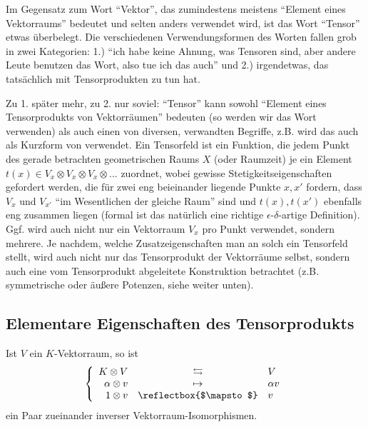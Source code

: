 \begin{remark}
Im Gegensatz zum Wort \enquote{Vektor}, das zumindestens meistens \enquote{Element eines Vektorraums} bedeutet und selten anders verwendet wird, ist das Wort \enquote{Tensor} etwas überbelegt. Die verschiedenen Verwendungsformen des Worten fallen grob in zwei Kategorien: 1.) \enquote{ich habe keine Ahnung, was Tensoren sind, aber andere Leute benutzen das Wort, also tue ich das auch} und 2.) irgendetwas, das tatsächlich mit Tensorprodukten zu tun hat.

\smallbreak
Zu 1. später mehr, zu 2. nur soviel: \enquote{Tensor} kann sowohl \enquote{Element eines Tensorprodukts von Vektorräumen} bedeuten (so werden wir das Wort verwenden) als auch einen von diversen, verwandten Begriffe, z.B. wird das auch als Kurzform von  verwendet. Ein Tensorfeld ist ein Funktion, die jedem Punkt des gerade betrachten geometrischen Raums $X$ (oder Raumzeit) je ein Element $t(x)\in V_x\otimes V_x \otimes V_x \otimes ... $ zuordnet, wobei gewisse Stetigkeitseigenschaften gefordert werden, die für zwei eng beieinander liegende Punkte $x,x'$ fordern, dass $V_x$ und $V_{x'}$ \enquote{im Wesentlichen der gleiche Raum} sind und $t(x),t(x')$ ebenfalls eng zusammen liegen (formal ist das natürlich eine richtige $\epsilon$-$\delta$-artige Definition). Ggf. wird auch nicht nur ein Vektorraum $V_x$ pro Punkt verwendet, sondern mehrere. Je nachdem, welche Zusatzeigenschaften man an solch ein Tensorfeld stellt, wird auch nicht nur das Tensorprodukt der Vektorräume selbst, sondern auch eine vom Tensorprodukt abgeleitete Konstruktion betrachtet (z.B. symmetrische oder äußere Potenzen, siehe weiter unten).
\end{remark}

\subsection{Elementare Eigenschaften des Tensorprodukts}

\begin{lemma}[{$K\otimes V = V$}]
Ist $V$ ein $K$-Vektorraum, so ist
\[\left\{\begin{array}{rcl}
K\otimes V & \leftrightarrows & V \\
\alpha\otimes v & \mapsto & \alpha v \\
1\otimes v & \reflectbox{$\mapsto$} & v
\end{array}\right.\]
ein Paar zueinander inverser Vektorraum-Isomorphismen.
\end{lemma}

